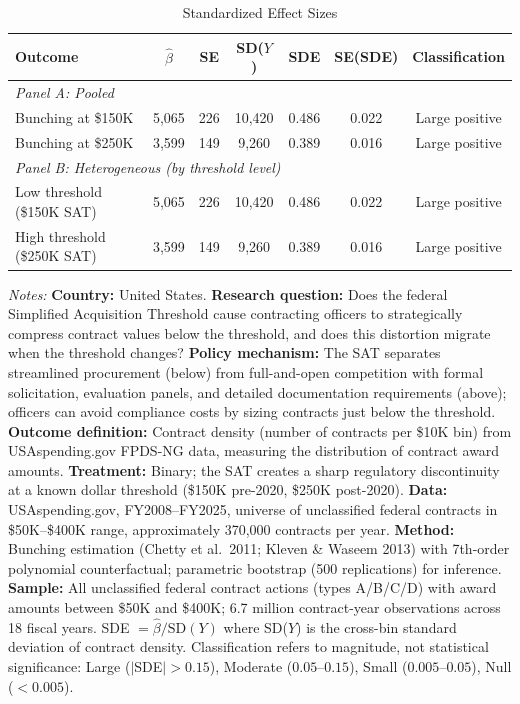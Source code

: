 \begin{table}[t]
\centering
\caption{Standardized Effect Sizes}
\label{tab:sde}
\begin{threeparttable}
\begin{tabular}{lcccccc}
\toprule
Outcome & $\hat{\beta}$ & SE & SD($Y$) & SDE & SE(SDE) & Classification \\
\midrule
\multicolumn{7}{l}{\textit{Panel A: Pooled}} \\
Bunching at \$150K & 5,065 & 226 & 10,420 & 0.486 & 0.022 & Large positive \\
Bunching at \$250K & 3,599 & 149 & 9,260 & 0.389 & 0.016 & Large positive \\
\midrule
\multicolumn{7}{l}{\textit{Panel B: Heterogeneous (by threshold level)}} \\
Low threshold (\$150K SAT) & 5,065 & 226 & 10,420 & 0.486 & 0.022 & Large positive \\
High threshold (\$250K SAT) & 3,599 & 149 & 9,260 & 0.389 & 0.016 & Large positive \\
\bottomrule
\end{tabular}
\begin{tablenotes}[flushleft]\small
\item \textit{Notes:} \textbf{Country:} United States. \textbf{Research question:} Does the federal Simplified Acquisition Threshold cause contracting officers to strategically compress contract values below the threshold, and does this distortion migrate when the threshold changes? \textbf{Policy mechanism:} The SAT separates streamlined procurement (below) from full-and-open competition with formal solicitation, evaluation panels, and detailed documentation requirements (above); officers can avoid compliance costs by sizing contracts just below the threshold. \textbf{Outcome definition:} Contract density (number of contracts per \$10K bin) from USAspending.gov FPDS-NG data, measuring the distribution of contract award amounts. \textbf{Treatment:} Binary; the SAT creates a sharp regulatory discontinuity at a known dollar threshold (\$150K pre-2020, \$250K post-2020). \textbf{Data:} USAspending.gov, FY2008--FY2025, universe of unclassified federal contracts in \$50K--\$400K range, approximately 370,000 contracts per year. \textbf{Method:} Bunching estimation (Chetty et al.\ 2011; Kleven \& Waseem 2013) with 7th-order polynomial counterfactual; parametric bootstrap (500 replications) for inference. \textbf{Sample:} All unclassified federal contract actions (types A/B/C/D) with award amounts between \$50K and \$400K; 6.7 million contract-year observations across 18 fiscal years. SDE $= \hat{\beta} / \text{SD}(Y)$ where SD($Y$) is the cross-bin standard deviation of contract density. Classification refers to magnitude, not statistical significance: Large ($|$SDE$| > 0.15$), Moderate ($0.05$--$0.15$), Small ($0.005$--$0.05$), Null ($< 0.005$).
\end{tablenotes}
\end{threeparttable}
\end{table}

